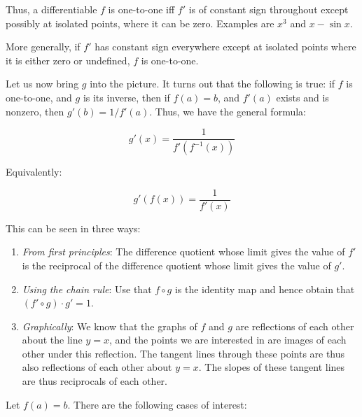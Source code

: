 \documentclass[10pt]{amsart}
\begin{document}
Thus, a differentiable $f$ is one-to-one iff $f'$ is of constant sign
throughout except possibly at isolated points, where it can be
zero. Examples are $x^3$ and $x - \sin x$.

More generally, if $f'$ has constant sign everywhere except at
isolated points where it is either zero or undefined, $f$ is
one-to-one.

Let us now bring $g$ into the picture. It turns out that the following
is true: if $f$ is one-to-one, and $g$ is its inverse, then if $f(a) =
b$, and $f'(a)$ exists and is nonzero, then $g'(b) = 1/f'(a)$. Thus,
we have the general formula:

$$g'(x) = \frac{1}{f'(f^{-1}(x))}$$

Equivalently:

$$g'(f(x)) = \frac{1}{f'(x)}$$

This can be seen in three ways:

\begin{enumerate}
\item {\em From first principles}: The difference quotient whose limit
  gives the value of $f'$ is the reciprocal of the difference quotient
  whose limit gives the value of $g'$.
\item {\em Using the chain rule}: Use that $f \circ g$ is the identity
  map and hence obtain that $(f' \circ g) \cdot g' = 1$.
\item {\em Graphically}: We know that the graphs of $f$ and $g$ are
  reflections of each other about the line $y = x$, and the points we
  are interested in are images of each other under this
  reflection. The tangent lines through these points are thus also
  reflections of each other about $y = x$. The slopes of these tangent
  lines are thus reciprocals of each other.
\end{enumerate}

Let $f(a) = b$. There are the following cases of interest:
\end{document}
